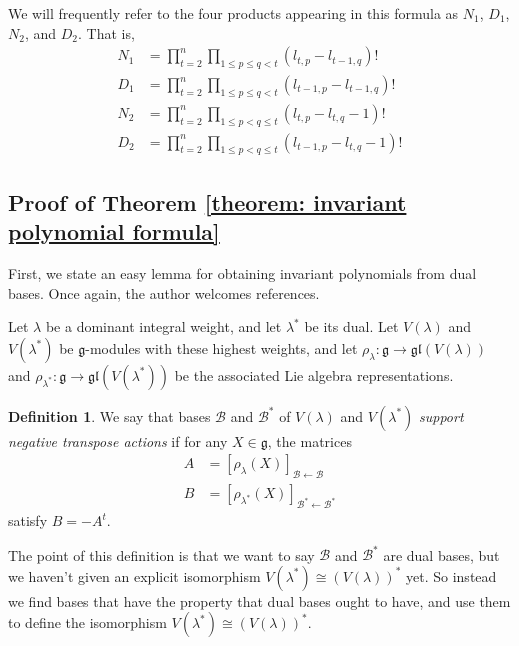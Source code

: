 \documentclass{amsart}[12pt]
\theoremstyle{definition}
\newtheorem{definition}[theorem]{Definition}
\numberwithin{equation}{section}
\begin{document}
We will frequently refer to the four products appearing in this formula as $N_1$, $D_1$, $N_2$, and $D_2$. That is, 
\begin{align*}
  N_1 &= \displaystyle\prod_{t=2}^{n}\prod_{1 \leq p \leq q < t} (l_{t,p} - l_{t-1,q})! \\
  D_1 &= \displaystyle\prod_{t=2}^{n} \prod_{1 \leq p \leq q < t} (l_{t-1,p} - l_{t-1,q})! \\
  N_2 &= \displaystyle\prod_{t=2}^{n} \prod_{1 \leq p < q \leq t} (l_{t,p} - l_{t,q}-1)! \\
  D_2 &= \displaystyle\prod_{t=2}^{n} \prod_{1 \leq p < q \leq t} (l_{t-1,p} - l_{t,q}-1)!
\end{align*}








\subsection{Proof of Theorem \ref{theorem: invariant polynomial formula} }

First, we state an easy lemma for obtaining invariant polynomials from
dual bases. Once again, the author welcomes references.

Let $\lambda$ be a dominant integral weight, and let $\lambda^{*}$ be its dual. Let $V(\lambda)$ and $V(\lambda^{*})$ be $\mathfrak{g}$-modules with these highest weights, and let $\rho_{\lambda}: \mathfrak{g} \rightarrow \mathfrak{gl}(V(\lambda))$ and $\rho_{\lambda^{*}}: \mathfrak{g} \rightarrow \mathfrak{gl}(V(\lambda^{*}))$ be the associated Lie algebra representations.


\begin{definition} \label{def: support negative transpose actions}
We say that bases $\mathscr{B}$ and $\mathscr{B}^{*}$ of $V(\lambda)$ and
$V(\lambda^{*})$ \emph{support negative transpose actions} if for any $X \in \mathfrak{g}$,
the matrices
\begin{align*}
  A &= [\rho_{\lambda} (X)]_{\mathscr{B}\leftarrow
        \mathscr{B}}\\
  B &= [\rho_{\lambda^{*}} (X)]_{\mathscr{B}^{*}\leftarrow
        \mathscr{B}^{*}}
\end{align*}
satisfy $B = -A^t$.
\end{definition}

The point of this definition is that we want to say $\mathscr{B}$ and $\mathscr{B}^{*}$
are dual bases, but we haven't given an explicit isomorphism
$V(\lambda^{*}) \cong (V(\lambda))^{*}$ yet. So instead we find bases that have the property that dual bases ought to have, and use them to define the isomorphism $V(\lambda^{*}) \cong (V(\lambda))^{*}$.
\end{document}
